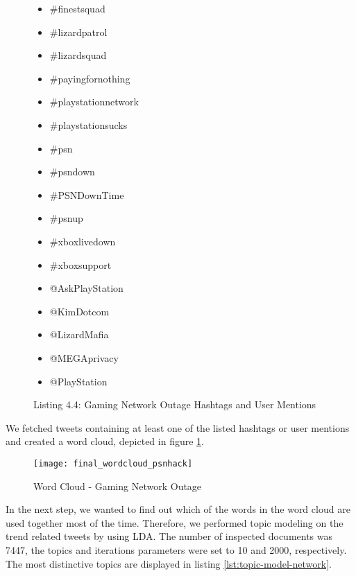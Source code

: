 \begin{figure}[H]
\begin{multicols}{3}
\begin{itemize}[label={}]
	\item \#finestsquad
	\item \#lizardpatrol
    \item \#lizardsquad
    \item \#payingfornothing
    \item \#playstationnetwork
    \item \#playstationsucks
    \item \#psn
    \item \#psndown
    \item \#PSNDownTime
    \item \#psnup
    \item \#xboxlivedown
    \item \#xboxsupport
    \item @AskPlayStation
    \item @KimDotcom
    \item @LizardMafia
    \item @MEGAprivacy
    \item @PlayStation
\end{itemize}
  \fixspacing
\end{multicols}
\caption*{Listing 4.4: Gaming Network Outage Hashtags and User Mentions}
\end{figure}

We fetched tweets containing at least one of the listed hashtags or user mentions and created a word cloud, depicted in figure \ref{fig:christmas-network-outage-word-cloud}.

\begin{figure}[H]
  \centering
        \texttt{[image: final\_wordcloud\_psnhack]}
  \caption[Word Cloud - Gaming Network Outage]{Word Cloud - Gaming Network Outage}
  \label{fig:christmas-network-outage-word-cloud}
  \vspace{-1.3em}
\end{figure}

In the next step, we wanted to find out which of the words in the word cloud are used together most of the time. Therefore, we performed topic modeling on the trend related tweets by using LDA. The number of inspected documents was 7447, the topics and iterations parameters were set to 10 and 2000, respectively.
The most distinctive topics are displayed in listing \ref{lst:topic-model-network}.


